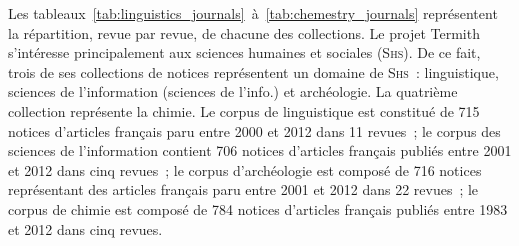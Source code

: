     \begin{table}
      \centering

      \caption{Détail des revues du corpus de chimie (Termith)
               \label{tab:chemestry_journals}}
    \end{table}
    Les tableaux~\ref{tab:linguistics_journals}~à~\ref{tab:chemestry_journals}
    représentent la répartition, revue par revue, de chacune des collections. Le
    projet Termith s'intéresse principalement aux sciences humaines et sociales
    (\textsc{Shs}). De ce fait, trois de ses collections de notices représentent
    un domaine de \textsc{Shs}~: linguistique, sciences de l'information
    (sciences de l'info.) et archéologie. La quatrième collection représente la
    chimie. Le corpus de linguistique est constitué de 715 notices d'articles
    français paru entre 2000 et 2012 dans 11 revues~; le corpus des sciences de
    l'information contient 706 notices d'articles français publiés entre 2001 et
    2012 dans cinq revues~; le corpus d'archéologie est composé de 716 notices
    représentant des articles français paru entre 2001 et 2012 dans 22 revues~;
    le corpus de chimie est composé de 784 notices d'articles français publiés
    entre 1983 et 2012 dans cinq revues.

